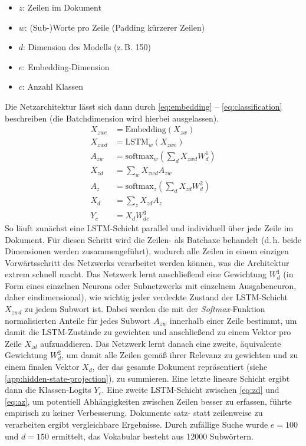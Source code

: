 \documentclass[bachelor,german]{info1thesis}
\begin{document}
%
\begin{itemize}
\itemsep-.5em
\item $z$: Zeilen im Dokument
\item $w$: (Sub-)Worte pro Zeile (Padding kürzerer Zeilen)
\item $d$: Dimension des Modells (z.\,B. 150)
\item $e$: Embedding-Dimension
\item $c$: Anzahl Klassen
\end{itemize}
%
Die Netzarchitektur lässt sich dann durch \autoref{eq:embedding} -- \ref{eq:classification} beschreiben (die Batchdimension wird hierbei ausgelassen).
%
\begin{align}
X_{zwe} &= \text{Embedding}(X_{zw}) \label{eq:embedding} \\
X_{zwd} &= \text{LSTM}_w(X_{zwe}) \label{eq:lstm} \\
A_{zw} &= \text{softmax}_w\left(\sum_d X_{zwd} W_{d}^1\right) \\
X_{zd} &= \sum_w X_{zwd} A_{zw} \label{eq:zd} \\
A_{z} &= \text{softmax}_z\left(\sum_d X_{zd} W_{d}^2\right) \label{eq:az} \\
X_{d} &= \sum_z X_{zd} A_z \label{eq:d} \\
Y_c &= X_d W_{dc}^3 \label{eq:classification}
\end{align}
%
So läuft zunächst eine LSTM-Schicht parallel und individuell über jede Zeile im Dokument. Für diesen Schritt wird die Zeilen- als Batchaxe behandelt (d.\,h. beide Dimensionen werden zusammengeführt), wodurch alle Zeilen in einem einzigen Vorwärtsschritt des Netzwerks verarbeitet werden können, was die Architektur extrem schnell macht. Das Netzwerk lernt anschließend eine Gewichtung $W_d^1$ (in Form eines einzelnen Neurons oder Subnetzwerks mit einzelnem Ausgabeneuron, daher eindimensional), wie wichtig jeder verdeckte Zustand der LSTM-Schicht $X_{zwd}$ zu jedem Subwort ist. Dabei werden die mit der \textit{Softmax}-Funktion normalisierten Anteile für jedes Subwort $A_{zw}$ innerhalb einer Zeile bestimmt, um damit die LSTM-Zustände zu gewichten und anschließend zu einem Vektor pro Zeile $X_{zd}$ aufzuaddieren. Das Netzwerk lernt danach eine zweite, äquivalente Gewichtung $W_d^2$, um damit alle Zeilen gemäß ihrer Relevanz zu gewichten und zu einem finalen Vektor $X_d$, der das gesamte Dokument repräsentiert (siehe \autoref{app:hidden-state-projection}), zu summieren. Eine letzte lineare Schicht ergibt dann die Klassen-Logits $Y_c$.
Eine zweite LSTM-Schicht zwischen \autoref{eq:zd} und \ref{eq:az}, um potentiell Abhängigkeiten zwischen Zeilen besser zu erfassen, führte empirisch zu keiner Verbesserung. Dokumente satz- statt zeilenweise zu verarbeiten ergibt vergleichbare Ergebnisse. Durch zufällige Suche wurde $e = 100$ und $d = 150$ ermittelt, das Vokabular besteht aus 12000 Subwörtern. \\
\end{document}
